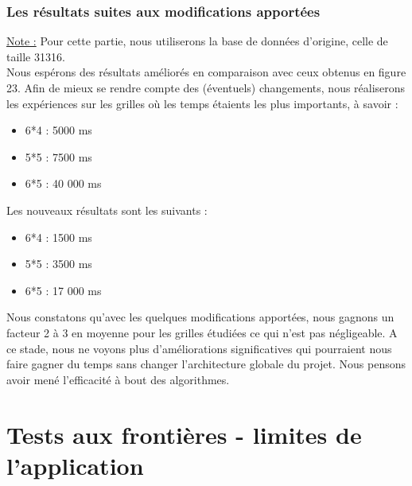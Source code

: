 \documentclass [ 11 pt ] {article}
\begin{document}
        \subsubsection{Les résultats suites aux modifications apportées}
            \underline{Note :} Pour cette partie, nous utiliserons la base de données d'origine, celle de taille 31316. \\
            
            
            Nous espérons des résultats améliorés en comparaison avec ceux obtenus en figure 23. Afin de mieux se rendre compte des (éventuels) changements, nous réaliserons les expériences sur les grilles où les temps étaients les plus importants, à savoir : 
            
            \begin{itemize}
                \item 6*4 : 5000 ms
                \item 5*5 : 7500 ms
                \item 6*5 : 40 000 ms
            \end{itemize}
            
            Les nouveaux résultats sont les suivants : 
            \begin{itemize}
                \item 6*4 : 1500 ms
                \item 5*5 : 3500 ms
                \item 6*5 : 17 000 ms
            \end{itemize}
            
            Nous constatons qu'avec les quelques modifications apportées, nous gagnons un facteur 2 à 3 en moyenne pour les grilles étudiées ce qui n'est pas négligeable. A ce stade, nous ne voyons plus d'améliorations significatives qui pourraient nous faire gagner du temps sans changer l'architecture globale du projet. Nous pensons avoir mené l'efficacité à bout des algorithmes. 
    \newpage
    \section{Tests aux frontières - limites de l'application}
    
\end{document}
